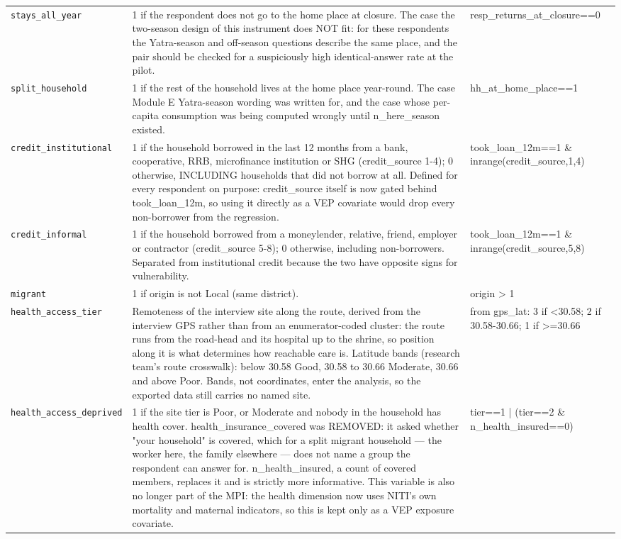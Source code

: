 \documentclass[10pt]{article}
\begin{document}
{\begin{longtable}{p{3.3cm}p{7.6cm}p{5.7cm}}
\texttt{stays\_all\_year} & 1 if the respondent does not go to the home place at closure. The case the two-season design of this instrument does NOT fit: for these respondents the Yatra-season and off-season questions describe the same place, and the pair should be checked for a suspiciously high identical-answer rate at the pilot. & resp\_returns\_at\_closure==0 \\
\texttt{split\_household} & 1 if the rest of the household lives at the home place year-round. The case Module E Yatra-season wording was written for, and the case whose per-capita consumption was being computed wrongly until n\_here\_season existed. & hh\_at\_home\_place==1 \\
\texttt{credit\_institutional} & 1 if the household borrowed in the last 12 months from a bank, cooperative, RRB, microfinance institution or SHG (credit\_source 1-4); 0 otherwise, INCLUDING households that did not borrow at all. Defined for every respondent on purpose: credit\_source itself is now gated behind took\_loan\_12m, so using it directly as a VEP covariate would drop every non-borrower from the regression. & took\_loan\_12m==1 \& inrange(credit\_source,1,4) \\
\texttt{credit\_informal} & 1 if the household borrowed from a moneylender, relative, friend, employer or contractor (credit\_source 5-8); 0 otherwise, including non-borrowers. Separated from institutional credit because the two have opposite signs for vulnerability. & took\_loan\_12m==1 \& inrange(credit\_source,5,8) \\
\texttt{migrant} & 1 if origin is not Local (same district). & origin > 1 \\
\texttt{health\_access\_tier} & Remoteness of the interview site along the route, derived from the interview GPS rather than from an enumerator-coded cluster: the route runs from the road-head and its hospital up to the shrine, so position along it is what determines how reachable care is. Latitude bands (research team's route crosswalk): below 30.58 Good, 30.58 to 30.66 Moderate, 30.66 and above Poor. Bands, not coordinates, enter the analysis, so the exported data still carries no named site. & from gps\_lat: 3 if <30.58; 2 if 30.58-30.66; 1 if >=30.66 \\
\texttt{health\_access\_deprived} & 1 if the site tier is Poor, or Moderate and nobody in the household has health cover. health\_insurance\_covered was REMOVED: it asked whether "your household" is covered, which for a split migrant household — the worker here, the family elsewhere — does not name a group the respondent can answer for. n\_health\_insured, a count of covered members, replaces it and is strictly more informative. This variable is also no longer part of the MPI: the health dimension now uses NITI's own mortality and maternal indicators, so this is kept only as a VEP exposure covariate. & tier==1 | (tier==2 \& n\_health\_insured==0) \\

\end{longtable}}
\end{document}
